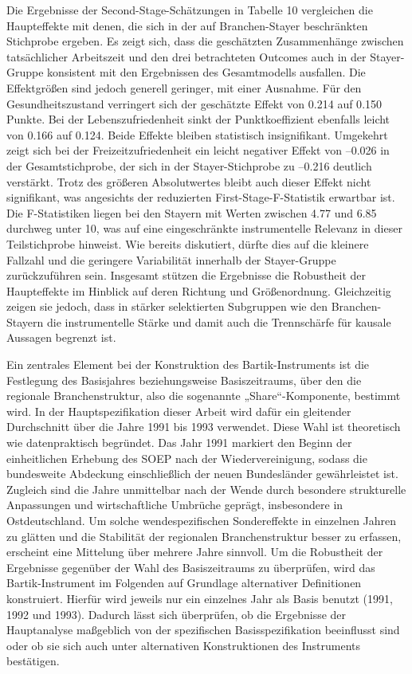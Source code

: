 \documentclass[12pt,a4paper]{article}
\begin{document}
Die Ergebnisse der Second-Stage-Schätzungen in Tabelle 10 vergleichen die Haupteffekte mit denen, die sich in der auf Branchen-Stayer beschränkten Stichprobe ergeben. Es zeigt sich, dass die geschätzten Zusammenhänge zwischen tatsächlicher Arbeitszeit und den drei betrachteten Outcomes auch in der Stayer-Gruppe konsistent mit den Ergebnissen des Gesamtmodells ausfallen. Die Effektgrößen sind jedoch generell geringer, mit einer Ausnahme. Für den Gesundheitszustand verringert sich der geschätzte Effekt von 0{.}214 auf 0{.}150 Punkte. Bei der Lebenszufriedenheit sinkt der Punktkoeffizient ebenfalls leicht von 0{.}166 auf 0{.}124. Beide Effekte bleiben statistisch insignifikant. Umgekehrt zeigt sich bei der Freizeitzufriedenheit ein leicht negativer Effekt von –0.026 in der Gesamtstichprobe, der sich in der Stayer-Stichprobe zu –0{.}216 deutlich verstärkt. Trotz des größeren Absolutwertes bleibt auch dieser Effekt nicht signifikant, was angesichts der reduzierten First-Stage-F-Statistik erwartbar ist. Die F-Statistiken liegen bei den Stayern mit Werten zwischen 4.77 und 6.85 durchweg unter 10, was auf eine eingeschränkte instrumentelle Relevanz in dieser Teilstichprobe hinweist.  Wie bereits diskutiert, dürfte dies auf die kleinere Fallzahl und die geringere Variabilität innerhalb der Stayer-Gruppe zurückzuführen sein. Insgesamt stützen die Ergebnisse die Robustheit der Haupteffekte im Hinblick auf deren Richtung und Größenordnung. Gleichzeitig zeigen sie jedoch, dass in stärker selektierten Subgruppen wie den Branchen-Stayern die instrumentelle Stärke und damit auch die Trennschärfe für kausale Aussagen begrenzt ist.

Ein zentrales Element bei der Konstruktion des Bartik-Instruments ist die Festlegung des Basisjahres beziehungsweise Basiszeitraums, über den die regionale Branchenstruktur, also die sogenannte „Share“-Komponente, bestimmt wird. In der Hauptspezifikation dieser Arbeit wird dafür ein gleitender Durchschnitt über die Jahre 1991 bis 1993 verwendet. Diese Wahl ist theoretisch wie datenpraktisch begründet. Das Jahr 1991 markiert den Beginn der einheitlichen Erhebung des SOEP nach der Wiedervereinigung, sodass die bundesweite Abdeckung einschließlich der neuen Bundesländer gewährleistet ist. Zugleich sind die Jahre unmittelbar nach der Wende durch besondere strukturelle Anpassungen und wirtschaftliche Umbrüche geprägt, insbesondere in Ostdeutschland. Um solche wendespezifischen Sondereffekte in einzelnen Jahren zu glätten und die Stabilität der regionalen Branchenstruktur besser zu erfassen, erscheint eine Mittelung über mehrere Jahre sinnvoll. Um die Robustheit der Ergebnisse gegenüber der Wahl des Basiszeitraums zu überprüfen, wird das Bartik-Instrument im Folgenden auf Grundlage alternativer Definitionen konstruiert. Hierfür wird jeweils nur ein einzelnes Jahr als Basis benutzt (1991, 1992 und 1993). Dadurch lässt sich überprüfen, ob die Ergebnisse der Hauptanalyse maßgeblich von der spezifischen Basisspezifikation beeinflusst sind oder ob sie sich auch unter alternativen Konstruktionen des Instruments bestätigen.
\end{document}
